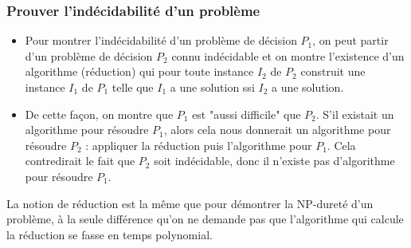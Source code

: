 \subsubsection{Prouver l'indécidabilité d'un problème}
\label{sub:prouver_l_indecidabilite_d_un_probleme}
\begin{itemize}[label=\textbullet]
    \item Pour montrer l'indécidabilité d'un problème de décision $P_1$, on peut partir d'un problème de décision $P_2$ connu
    indécidable et on montre l'existence d'un algorithme (réduction) qui pour toute instance $I_2$ de $P_2$ construit une instance
    $I_1$ de $P_1$ telle que $I_1$ a une solution ssi $I_2$ a une solution.
    \item De cette façon, on montre que $P_1$ est "aussi difficile" que $P_2$. S'il existait un algorithme pour résoudre $P_1$,
    alors cela nous donnerait un algorithme pour résoudre $P_2$ : appliquer la réduction puis l'algorithme pour $P_1$. Cela 
    contredirait le fait que $P_2$ soit indécidable, donc il n'existe pas d'algorithme pour résoudre $P_1$.
\end{itemize}
\begin{remark}
    La notion de réduction est la même que pour démontrer la NP-dureté d'un problème, à la seule différence qu'on ne demande pas
    que l'algorithme qui calcule la réduction se fasse en temps polynomial.
\end{remark}